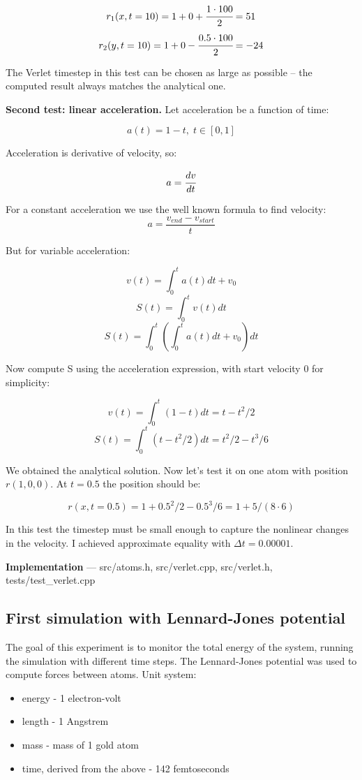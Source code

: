 \documentclass[12pt,a4paper]{article}
\begin{document}
\[ r_1(x, t=10) = 1 + 0 + \cfrac{1 \cdot 100}{2} = 51 \]
\[ r_2(y, t=10) = 1 + 0 - \cfrac{0.5 \cdot 100}{2} = -24 \]

The Verlet timestep in this test can be chosen as large as possible -- the computed result always matches the analytical one.

{\bf Second test: linear acceleration.} Let acceleration be a function of time:

\[ a(t) = 1 - t,\; t \in [0, 1] \]

Acceleration is derivative of velocity, so:

\[ a = \cfrac{dv}{dt} \]

For a constant acceleration we use the well known formula to find velocity: \[ a = \frac{v_{end}-v_{start}}{t} \]

But for variable acceleration:

\[ v(t) = \int_0^t a(t) dt + v_0 \]
\[ S(t) = \int_0^t v(t) dt \]
\[ S(t) = \int_0^t \left( \int_0^t a(t) dt + v_0 \right) dt\]

Now compute S using the acceleration expression, with start velocity 0 for simplicity:

\[ v(t) = \int_0^t (1-t) dt = t - t^2 / 2\]
\[ S(t) = \int_0^t (t - t^2/2) dt = t^2/2 - t^3/6 \]

We obtained the analytical solution. Now let's test it on one atom with position $r(1, 0, 0)$. At $t=0.5$ the position should be:

\[ r(x, t=0.5) = 1 + 0.5^2/2 - 0.5^3/6 = 1 + 5/(8 \cdot 6)\]

In this test the timestep must be small enough to capture the nonlinear changes in the velocity. I achieved approximate equality with $\Delta t = 0.00001$.

{\bf Implementation} --- src/atoms.h, src/verlet.cpp, src/verlet.h, tests/test\_verlet.cpp

\subsection*{First simulation with Lennard-Jones potential}

The goal of this experiment is to monitor the total energy of the system, running the simulation with different time steps. The Lennard-Jones potential was used to compute forces between atoms. Unit system:

\begin{itemize}
	\item energy - 1 electron-volt
	\item length - 1 Angstrem
	\item mass - mass of 1 gold atom 
	\item time, derived from the above - 142 femtoseconds
\end{itemize}
\end{document}
